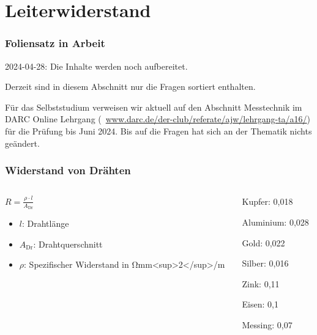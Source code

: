 
\section{Leiterwiderstand}
\label{section:leiterwiderstand}
\begin{frame}%

\frametitle{Foliensatz in Arbeit}
2024-04-28: Die Inhalte werden noch aufbereitet.

Derzeit sind in diesem Abschnitt nur die Fragen sortiert enthalten.

Für das Selbststudium verweisen wir aktuell auf den Abschnitt Messtechnik im DARC Online Lehrgang (\textcolor{DARCblue}{\faLink~\href{https://www.darc.de/der-club/referate/ajw/lehrgang-ta/a16/}{www.darc.de/der-club/referate/ajw/lehrgang-ta/a16/}}) für die Prüfung bis Juni 2024. Bis auf die Fragen hat sich an der Thematik nichts geändert.

\end{frame}

\begin{frame}
\frametitle{Widerstand von Drähten}
\begin{columns}
    \begin{column}{0.48\textwidth}
    $R = \frac{\rho\cdot l}{A_{\textrm{Dr}}}$

\begin{itemize}
  \item $l$: Drahtlänge
  \item $A_{\textrm{Dr}}$: Drahtquerschnitt
  \item $\rho$: Spezifischer Widerstand in Ωmm<sup>2</sup>/m
  \end{itemize}

    \end{column}
   \begin{column}{0.48\textwidth}
       
    \pause
    Kupfer: 0,018

Aluminium: 0,028

Gold: 0,022

Silber: 0,016

Zink: 0,11

Eisen: 0,1

Messing: 0,07




   \end{column}
\end{columns}

\end{frame}

